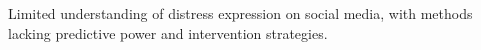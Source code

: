 Limited understanding of distress expression on social media, with methods lacking predictive power and intervention strategies.